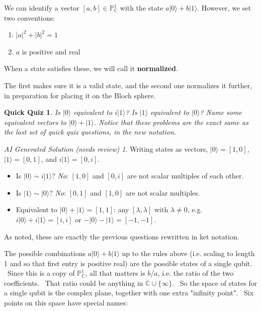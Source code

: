 \documentclass{article}
\theoremstyle{plain}
\newtheorem{quiz}[theorem]{Quick Quiz}
\theoremstyle{definition}
\theoremstyle{remark}
\newtheorem*{aisolution}{AI Generated Solution (needs review)}
\numberwithin{theorem}{section}
\newcommand{\CC}{\mathbb{C}}
\newcommand{\PP}{\mathbb{P}}
\begin{document}
We can identify a vector $[a,b] \in \PP^1_\CC$ with the state $a |0 \rangle + b |1 \rangle$.  However, we set two conventions:

\begin{enumerate}
	\item $|a|^2 + |b|^2 = 1$
	\item $a$ is positive and real
\end{enumerate}
When a state satisfies these, we will call it \textbf{normalized}.

The first makes sure it is a valid state, and the second one normalizes it further, in preparation for placing it on the Bloch sphere.

\begin{quiz}
Is $|0\rangle$ equivalent to $i|1\rangle$?
Is $|1\rangle$ equivalent to $|0 \rangle$?
Name some equivalent vectors to $|0\rangle + |1\rangle$.
Notice that these problems are the exact same as the last set of quick quiz questions, in the new notation.
\end{quiz}
\begin{aisolution}
Writing states as vectors, $|0\rangle = [1,0]$, $|1\rangle = [0,1]$, and $i|1\rangle = [0,i]$.
\begin{itemize}
\item Is $|0\rangle \sim i|1\rangle$? \emph{No}: $[1,0]$ and $[0,i]$ are not scalar multiples of each other.
\item Is $|1\rangle \sim |0\rangle$? \emph{No}: $[0,1]$ and $[1,0]$ are not scalar multiples.
\item Equivalent to $|0\rangle + |1\rangle = [1,1]$: any $[\lambda,\lambda]$ with $\lambda \neq 0$, e.g. $i|0\rangle + i|1\rangle = [i,i]$ or $-|0\rangle - |1\rangle = [-1,-1]$.
\end{itemize}
As noted, these are exactly the previous questions rewritten in ket notation.
\end{aisolution}

The possible combinations $a |0\rangle + b|1\rangle$ up to the rules above (i.e. scaling to length 1 and so that first entry is positive real) are the possible states of a single qubit.   Since this is a copy of $\mathbb{P}^1_\mathbb{C}$, all that matters is $b/a$, i.e. the ratio of the two coefficients.  That ratio could be anything in $\mathbb{C} \cup \{ \infty \}$.  So the space of states for a single qubit is the complex plane, together with one extra "infinity point".  Six points on this space have special names:
\end{document}
